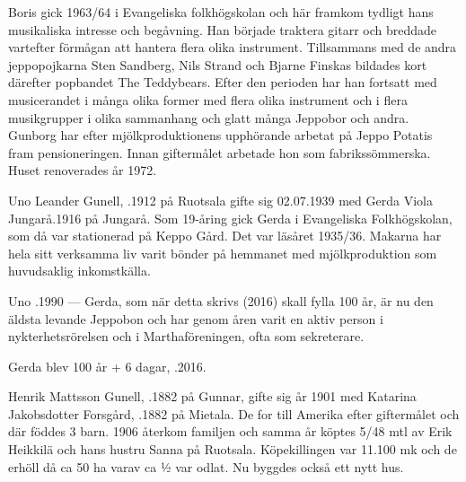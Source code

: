 Boris gick 1963/64 i Evangeliska folkhögskolan och här framkom tydligt hans musikaliska intresse och begåvning. Han började traktera gitarr och breddade vartefter förmågan att hantera flera olika instrument. Tillsammans med de andra jeppopojkarna Sten Sandberg, Nils Strand och Bjarne Finskas bildades kort därefter popbandet The Teddybears. Efter den perioden har han fortsatt med musicerandet i många	olika former med flera olika instrument och i flera musikgrupper i olika sammanhang och glatt många Jeppobor och andra. Gunborg har efter mjölkproduktionens upphörande arbetat på Jeppo Potatis fram pensioneringen. Innan giftermålet arbetade hon som fabrikssömmerska. Huset renoverades år 1972.
\begin{jhchildren}
  \item {}
  \item {}
\end{jhchildren}


Uno Leander Gunell, .1912 på Ruotsala gifte sig 02.07.1939 med Gerda Viola Jungarå.1916 på Jungarå. Som 19-åring gick Gerda i Evangeliska Folkhögskolan, som då var stationerad på Keppo Gård. Det var läsåret 1935/36. Makarna har hela sitt verksamma liv varit bönder på hemmanet med mjölkproduktion som huvudsaklig inkomstkälla.
\begin{jhchildren}
  \item {}
  \item {}
\end{jhchildren}

Uno .1990 ---  Gerda, som när detta skrivs (2016) skall fylla 100 år, är nu den äldsta levande Jeppobon och har genom åren varit en aktiv person i nykterhetsrörelsen och i Marthaföreningen, ofta som sekreterare.

Gerda blev 100 år + 6 dagar, .2016.





Henrik Mattsson Gunell, .1882 på Gunnar, gifte sig år 1901 med Katarina Jakobsdotter Forsgård, .1882 på Mietala. De for till Amerika efter giftermålet och där föddes 3 barn. 1906 återkom familjen och samma år köptes 5/48 mtl av Erik Heikkilä och hans hustru Sanna på Ruotsala. Köpekillingen var 11.100 mk och de erhöll då ca 50 ha varav ca ½ var odlat. Nu byggdes också ett nytt hus.

